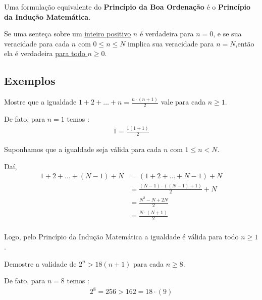         \vspace{0.05cm}
        \noindent Uma formulação equivalente do \textbf{Princípio da Boa Ordenação} é o \textbf{Princípio da Indução Matemática}.

        \begin{definicao}
            Se uma senteça sobre um \underline{inteiro positivo} $n$ é verdadeira para $n = 0$, e se sua veracidade 
            para cada $n$ com \underline{$0 \leq n \leq N$} implica sua veracidade para \underline{$n = N$},então ela é verdadeira \underline{para todo $n \geq 0$}. 
        \end{definicao}

    \subsection{Exemplos}

    \begin{exemplo}
    Mostre que a igualdade $1+2+\dots+n=\tfrac{n\cdot(n+1)}{2}$ vale para cada $n\ge1$.
    \end{exemplo}

    De fato, para $n=1$ temos :
    \begin{align*}
    1 = \frac{1(1+1)}{2}
    \end{align*}

    Suponhamos que a igualdade seja válida para cada $n$ com $1 \leq n < N$.

    Daí,
    \begin{align*}
        1+2+\dotsc +(N-1)+N &= (1+2+\dotsc +N-1) + N \\
        &= \frac{(N-1) \cdot ((N-1) + 1)}{2} + N \\
        &= \frac{N^2 - N + 2N}{2} \\
        &= \frac{N \cdot (N+1)}{2} \\
    \end{align*}

    Logo, pelo Princípio da Indução Matemática a igualdade é válida para todo $n \ge 1$.

    \begin{exemplo}[]
    Demostre a validade de $2^n > 18(n+1)$ para cada $n \ge 8$.
    \end{exemplo}

    De fato, para $n = 8$ temos : 
    \begin{align*}
    2^8 = 256 > 162 = 18\cdot(9)
    \end{align*}

